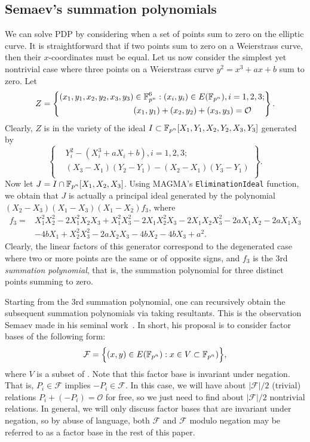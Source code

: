 \subsection{Semaev's summation polynomials}
%
\label{sec:summation-polynomials}
%
We can solve PDP by considering when a set of points sum to zero on
the elliptic curve.
%
It is straightforward that if two points sum to zero on a Weierstrass
curve, then their $x$-coordinates must be equal.
%
Let us now consider the simplest yet nontrivial case where three
points on a Weierstrass curve $y^2=x^3+ax+b$ sum to zero.
%
Let
\[ Z=\left\{\begin{aligned}
      (x_1,y_1,x_2,y_2,x_3,y_3)&\in\mathbb F_{p^n}^6:(x_i,y_i)\in E(\mathbb F_{p^n}),i=1,2,3; \\
      & (x_1,y_1)+(x_2,y_2)+(x_3,y_3)=\mathcal O
    \end{aligned} \right\}. \]
%
Clearly, $Z$ is in the variety of the ideal
$I\subset\mathbb F_{p^n}[X_1,Y_1,X_2,Y_2,X_3,Y_3]$ generated by
\[ \left\{\begin{aligned}
      & Y_i^2 - (X_i^3 + aX_i + b),i=1,2,3; \\
      &  (X_3 - X_1)(Y_2 - Y_1) - (X_2 - X_1)(Y_3 - Y_1)\\
    \end{aligned}\right\}. \]
%
Now let $J=I\cap\mathbb F_{p^n}[X_1,X_2,X_3]$.
%
Using MAGMA's \texttt{EliminationIdeal} function, we obtain that $J$
is actually a principal ideal generated by the polynomial
$(X_2 - X_3)(X_1 - X_3)(X_1 - X_2)f_3$, where
%
\begin{align*}
  f_3 = & X_1^2X_2^2 - 2X_1^2X_2X_3 + X_1^2X_3^2 - 2X_1X_2^2X_3 - 2X_1X_2X_3^2 - 2aX_1X_2 - 2aX_1X_3 \\
        & - 4bX_1 + X_2^2X_3^2 - 2aX_2X_3 - 4bX_2 - 4bX_3 + a^2.
\end{align*}
%
Clearly, the linear factors of this generator correspond to the
degenerated case where two or more points are the same or of opposite
signs, and $f_3$ is the 3rd \emph{summation polynomial}, that is, the
summation polynomial for three distinct points summing to zero.

Starting from the 3rd summation polynomial, one can recursively obtain
the subsequent summation polynomials via taking resultants.
%
This is the observation Semaev made in his seminal
work~\cite{DBLP:journals/iacr/Semaev04}.
%
In short, his proposal is to consider factor bases of the following
form:
\[ \mathcal F=\Big\{(x,y)\in E(\mathbb F_{p^n}):x\in
  V\subset\mathbb F_{p^n})\Big\}, \] where $V$ is a subset of .
%
Note that this factor base is invariant under negation.
%
That is, $P_i\in\mathcal F$ implies $-P_i\in\mathcal F$.
%
In this case, we will have about $|\mathcal F|/2$ (trivial) relations
$P_i+(-P_i)=\mathcal O$ for free, so we just need to find about
$|\mathcal F|/2$ nontrivial relations.
%
In general, we will only discuss factor bases that are invariant under
negation, so by abuse of language, both $\mathcal F$ and $\mathcal F$
modulo negation may be referred to as a factor base in the rest of
this paper.


